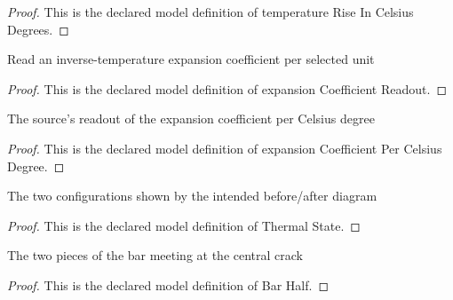 \begin{proof}
  This is the declared model definition of temperature Rise In Celsius Degrees.
\end{proof}
\begin{definition}
  \label{def:physics:phyx-mini-0154:phyxminiproblems-problemphyxmini0154-expansioncoefficientreadout}
  Read an inverse-temperature expansion coefficient per selected unit
\end{definition}
\begin{proof}
  This is the declared model definition of expansion Coefficient Readout.
\end{proof}
\begin{definition}
  \label{def:physics:phyx-mini-0154:phyxminiproblems-problemphyxmini0154-expansioncoefficientpercelsiusdegree}
  The source's readout of the expansion coefficient per Celsius degree
\end{definition}
\begin{proof}
  This is the declared model definition of expansion Coefficient Per Celsius Degree.
\end{proof}
\begin{definition}
  \label{def:physics:phyx-mini-0154:phyxminiproblems-problemphyxmini0154-thermalstate}
  The two configurations shown by the intended before/after diagram
\end{definition}
\begin{proof}
  This is the declared model definition of Thermal State.
\end{proof}
\begin{definition}
  \label{def:physics:phyx-mini-0154:phyxminiproblems-problemphyxmini0154-barhalf}
  The two pieces of the bar meeting at the central crack
\end{definition}
\begin{proof}
  This is the declared model definition of Bar Half.
\end{proof}
